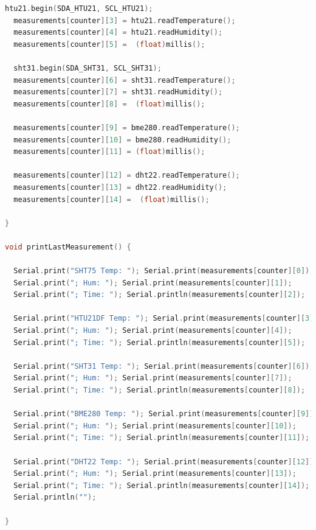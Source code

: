 \documentclass[runningheads]{llncs}
\begin{document}
\begin{lstlisting}[language=C]
  htu21.begin(SDA_HTU21, SCL_HTU21);
  measurements[counter][3] = htu21.readTemperature();
  measurements[counter][4] = htu21.readHumidity();
  measurements[counter][5] =  (float)millis();
  
  sht31.begin(SDA_SHT31, SCL_SHT31);
  measurements[counter][6] = sht31.readTemperature();
  measurements[counter][7] = sht31.readHumidity();
  measurements[counter][8] =  (float)millis();

  measurements[counter][9] = bme280.readTemperature();
  measurements[counter][10] = bme280.readHumidity();
  measurements[counter][11] = (float)millis();

  measurements[counter][12] = dht22.readTemperature();
  measurements[counter][13] = dht22.readHumidity();
  measurements[counter][14] =  (float)millis();
  
}

void printLastMeasurement() {
  
  Serial.print("SHT75 Temp: "); Serial.print(measurements[counter][0]);
  Serial.print("; Hum: "); Serial.print(measurements[counter][1]);
  Serial.print("; Time: "); Serial.println(measurements[counter][2]);
  
  Serial.print("HTU21DF Temp: "); Serial.print(measurements[counter][3]);
  Serial.print("; Hum: "); Serial.print(measurements[counter][4]);
  Serial.print("; Time: "); Serial.println(measurements[counter][5]);
  
  Serial.print("SHT31 Temp: "); Serial.print(measurements[counter][6]);
  Serial.print("; Hum: "); Serial.print(measurements[counter][7]);
  Serial.print("; Time: "); Serial.println(measurements[counter][8]);
  
  Serial.print("BME280 Temp: "); Serial.print(measurements[counter][9]);
  Serial.print("; Hum: "); Serial.print(measurements[counter][10]);
  Serial.print("; Time: "); Serial.println(measurements[counter][11]);

  Serial.print("DHT22 Temp: "); Serial.print(measurements[counter][12]);
  Serial.print("; Hum: "); Serial.print(measurements[counter][13]);
  Serial.print("; Time: "); Serial.println(measurements[counter][14]);
  Serial.println("");

}


\end{lstlisting}
\end{document}
